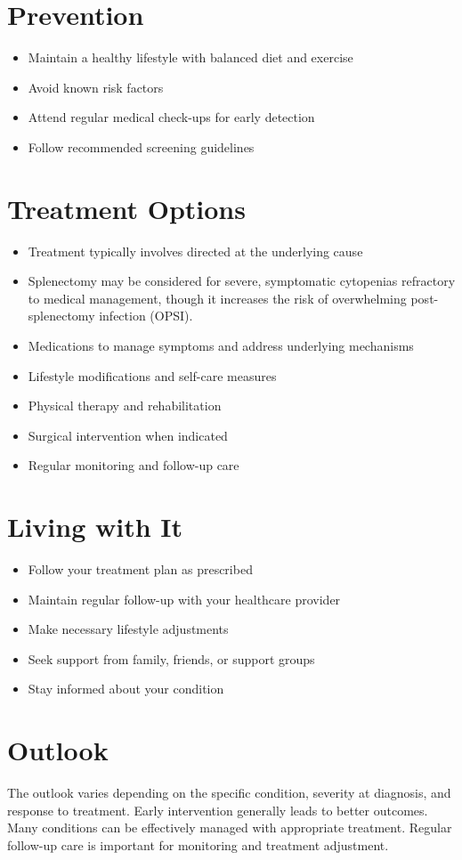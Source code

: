 \section{Prevention}
\begin{itemize}[noitemsep]
  \item Maintain a healthy lifestyle with balanced diet and exercise
  \item Avoid known risk factors
  \item Attend regular medical check-ups for early detection
  \item Follow recommended screening guidelines
\end{itemize}
\section{Treatment Options}
\begin{itemize}[noitemsep]
  \item Treatment typically involves directed at the underlying cause
  \item Splenectomy may be considered for severe, symptomatic cytopenias refractory to medical management, though it increases the risk of overwhelming post-splenectomy infection (OPSI).
  \item Medications to manage symptoms and address underlying mechanisms
  \item Lifestyle modifications and self-care measures
  \item Physical therapy and rehabilitation
  \item Surgical intervention when indicated
  \item Regular monitoring and follow-up care
\end{itemize}
\section{Living with It}
\begin{itemize}[noitemsep]
  \item Follow your treatment plan as prescribed
  \item Maintain regular follow-up with your healthcare provider
  \item Make necessary lifestyle adjustments
  \item Seek support from family, friends, or support groups
  \item Stay informed about your condition
\end{itemize}
\section{Outlook}
The outlook varies depending on the specific condition, severity at diagnosis, and response to treatment. Early intervention generally leads to better outcomes. Many conditions can be effectively managed with appropriate treatment. Regular follow-up care is important for monitoring and treatment adjustment.
